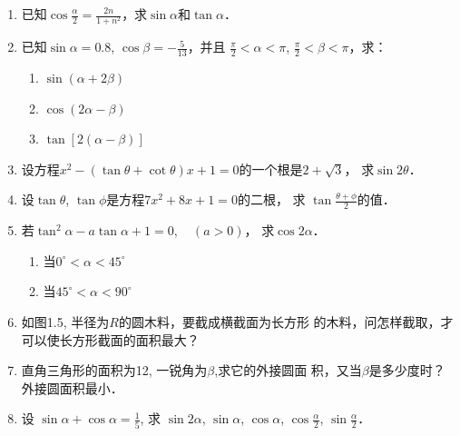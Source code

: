 \begin{enumerate}
\item 已知$\cos\frac{\alpha}{2}=\frac{2n}{1+n^2}$，求$\sin\alpha$和$\tan\alpha$．
\item 已知$\sin\alpha=0.8$, $\cos\beta=-\frac{5}{13}$，并且
$\frac{\pi}{2}<\alpha<\pi$, $\frac{\pi}{2}<\beta<\pi$，求：
\begin{enumerate}
    \item $\sin(\alpha+2\beta)$
    \item $\cos(2\alpha-\beta)$
    \item $\tan[2(\alpha-\beta)]$
\end{enumerate}
\item 设方程$x^2-(\tan \theta+\cot \theta)x+1=0$的一个根是$2+\sqrt{3}$，
求$\sin2\theta$．
\item 设$\tan \theta$, $\tan \phi$是方程$7x^2+8x+1=0$的二根，
求 $\tan\frac{\theta+\phi}{2}$的值．
\item 若$\tan^2 \alpha-a\tan \alpha+1=0,\quad (a>0)$，
求$\cos2\alpha$．
\begin{enumerate}
    \item 当$0^{\circ}<\alpha<45^{\circ}$
    \item 当$45^{\circ}<\alpha<90^{\circ}$
\end{enumerate}

\item 如图1.5, 半径为$R$的圆木料，要截成横截面为长方形
的木料，问怎样截取，才可以使长方形截面的面积最大？
\begin{figure}[htp]
    \centering
{}
    \caption{}
\end{figure}


\item 直角三角形的面积为12, 一锐角为$\beta$,求它的外接圆面
积，又当$\beta$是多少度时？外接圆面积最小．
\item 设 $\sin\alpha +\cos\alpha=\frac{1}{5}$,
求 $\sin2\alpha$, $\sin\alpha$, $\cos\alpha$, $\cos \frac{\alpha}{2}$, $\sin \frac{\alpha}{2}$．


\end{enumerate}
